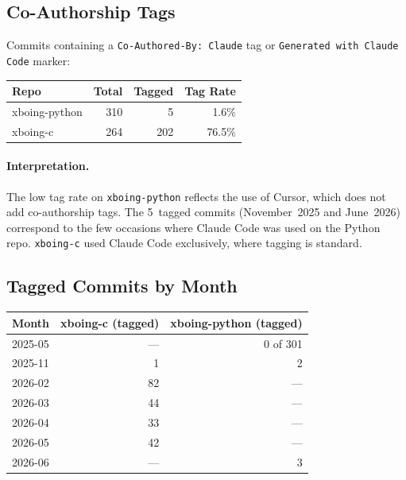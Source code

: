 \documentclass[a4paper,10pt]{article}
\newcommand{\repo}[1]{\texttt{#1}}
\begin{document}
\subsection{Co-Authorship Tags}

Commits containing a \texttt{Co-Authored-By: Claude} tag or
\texttt{Generated with Claude Code} marker:

\begin{center}
\begin{tabular}{@{}lrrr@{}}
\toprule
\textbf{Repo} & \textbf{Total} & \textbf{Tagged} &
  \textbf{Tag Rate} \\
\midrule
xboing-python & 310 & 5 & 1.6\% \\
xboing-c & 264 & 202 & 76.5\% \\
\bottomrule
\end{tabular}
\end{center}

\paragraph{Interpretation.}  The low tag rate on
\repo{xboing-python} reflects the use of Cursor, which does not add
co-authorship tags.  The 5~tagged commits (November~2025 and
June~2026) correspond to the few occasions where Claude Code was
used on the Python repo.  \repo{xboing-c} used Claude Code
exclusively, where tagging is standard.

\subsection{Tagged Commits by Month}

\begin{center}
\begin{tabular}{@{}lrr@{}}
\toprule
\textbf{Month} & \textbf{xboing-c (tagged)} &
  \textbf{xboing-python (tagged)} \\
\midrule
2025-05 & --- & 0 of 301 \\
2025-11 & 1 & 2 \\
2026-02 & 82 & --- \\
2026-03 & 44 & --- \\
2026-04 & 33 & --- \\
2026-05 & 42 & --- \\
2026-06 & --- & 3 \\
\bottomrule
\end{tabular}
\end{center}

\end{document}
